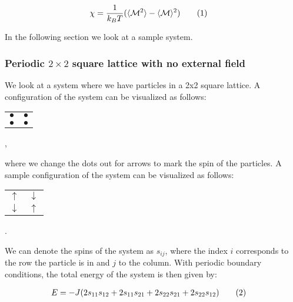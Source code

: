 \documentclass[reprint,english,notitlepage]{revtex4-1}  %
\newcommand\numberthis{\addtocounter{equation}{1}\tag{\theequation}}
\begin{document}
\begin{align*}
\chi &= \frac{1}{k_B T} ( \langle \mathcal{M}^2 \rangle - \langle \mathcal{M} \rangle^2) \numberthis \label{eq:magnetic_susceptibility}
\end{align*}

In the following section we look at a sample system.


\subsubsection{Periodic \( 2 \times 2 \) square lattice with no external field}

We look at a system where we have particles in a 2x2 square lattice. A configuration of the system can be visualized as follows: \newline

\begin{center}
\begin{tabular}{cc}
$\bullet$ & $\bullet$ \\
$\bullet$ & $\bullet$
\end{tabular}  , \newline
\end{center}

where we change the dots out for arrows to mark the spin of the particles. A sample configuration of the system can be visualized as follows: \newline

\begin{center}
\begin{tabular}{cc}
$\uparrow$ & $\downarrow$ \\
$\downarrow$ & $\uparrow$
\end{tabular}  . \newline
\end{center}


We can denote the spins of the system as $s_{ij}$, where the index $i$ corresponds to the row the particle is in and $j$ to the column. With periodic boundary conditions, the total energy of the system is then given by:

\begin{align*}
E &= -J ( 2s_{11}s_{12} + 2s_{11}s_{21} + 2s_{22}s_{21} + 2s_{22}s_{12}) \numberthis \label{eq:2x2_sq_lattice_en}
\end{align*}
\end{document}
